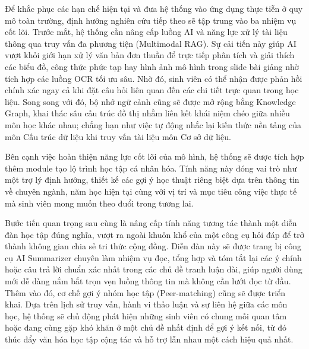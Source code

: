 Để khắc phục các hạn chế hiện tại và đưa hệ thống vào ứng dụng thực tiễn ở quy mô toàn trường, định hướng nghiên cứu tiếp theo sẽ tập trung vào ba nhiệm vụ cốt lõi. Trước mắt, hệ thống cần nâng cấp luồng AI và năng lực xử lý tài liệu thông qua truy vấn đa phương tiện (Multimodal RAG). Sự cải tiến này giúp AI vượt khỏi giới hạn xử lý văn bản đơn thuần để trực tiếp phân tích và giải thích các biểu đồ, công thức phức tạp hay hình ảnh mô hình trong slide bài giảng nhờ tích hợp các luồng OCR tối ưu sâu. Nhờ đó, sinh viên có thể nhận được phản hồi chính xác ngay cả khi đặt câu hỏi liên quan đến các chi tiết trực quan trong học liệu. Song song với đó, bộ nhớ ngữ cảnh cũng sẽ được mở rộng bằng Knowledge Graph, khai thác sâu cấu trúc đồ thị nhằm liên kết khái niệm chéo giữa nhiều môn học khác nhau; chẳng hạn như việc tự động nhắc lại kiến thức nền tảng của môn Cấu trúc dữ liệu khi truy vấn tài liệu môn Cơ sở dữ liệu.

Bên cạnh việc hoàn thiện năng lực cốt lõi của mô hình, hệ thống sẽ được tích hợp thêm module tạo lộ trình học tập cá nhân hóa. Tính năng này đóng vai trò như một trợ lý định hướng, thiết kế các gợi ý học thuật riêng biệt dựa trên thông tin về chuyên ngành, năm học hiện tại cùng với vị trí và mục tiêu công việc thực tế mà sinh viên mong muốn theo đuổi trong tương lai. 

Bước tiến quan trọng sau cùng là nâng cấp tính năng tương tác thành một diễn đàn học tập đúng nghĩa, vượt ra ngoài khuôn khổ của một công cụ hỏi đáp để trở thành không gian chia sẻ tri thức cộng đồng. Diễn đàn này sẽ được trang bị công cụ AI Summarizer chuyên làm nhiệm vụ đọc, tổng hợp và tóm tắt lại các ý chính hoặc câu trả lời chuẩn xác nhất trong các chủ đề tranh luận dài, giúp người dùng mới dễ dàng nắm bắt trọn vẹn luồng thông tin mà không cần lướt đọc từ đầu. Thêm vào đó, cơ chế gợi ý nhóm học tập (Peer-matching) cũng sẽ được triển khai. Dựa trên lịch sử truy vấn, hành vi thảo luận và sự liên hệ giữa các môn học, hệ thống sẽ chủ động phát hiện những sinh viên có chung mối quan tâm hoặc đang cùng gặp khó khăn ở một chủ đề nhất định để gợi ý kết nối, từ đó thúc đẩy văn hóa học tập cộng tác và hỗ trợ lẫn nhau một cách hiệu quả nhất.
